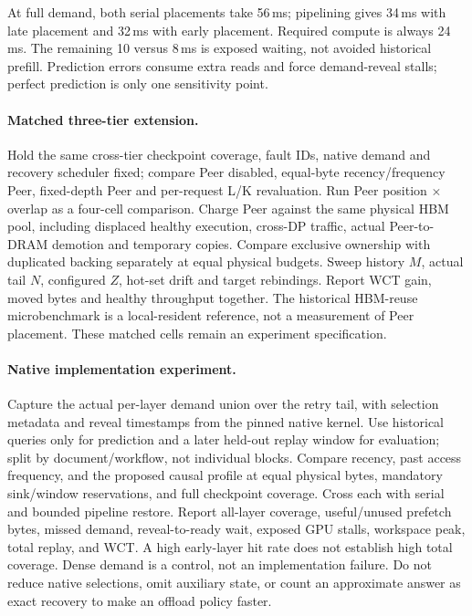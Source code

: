 \documentclass[sigplan,10pt,anonymous,nonacm]{acmart}
\begin{document}
At full demand, both serial placements take 56\,ms; pipelining gives
34\,ms with late placement and 32\,ms with early placement. Required
compute is always 24\,ms. The remaining 10 versus 8\,ms is exposed
waiting, not avoided historical prefill. Prediction errors consume
extra reads and force demand-reveal stalls; perfect prediction is only
one sensitivity point.

\paragraph{Matched three-tier extension.}
Hold the same cross-tier checkpoint coverage, fault IDs, native demand
and recovery scheduler fixed; compare Peer disabled, equal-byte
recency/frequency Peer, fixed-depth Peer and per-request L/K revaluation.
Run Peer position $\times$ overlap as a four-cell comparison. Charge
Peer against the same physical HBM pool, including displaced healthy
execution, cross-DP traffic, actual Peer-to-DRAM demotion and temporary
copies. Compare exclusive ownership with duplicated backing separately
at equal physical budgets. Sweep history $M$, actual tail $N$, configured
$Z$, hot-set drift and target rebindings. Report WCT gain, moved bytes and
healthy throughput together. The historical HBM-reuse microbenchmark is
a local-resident reference, not a measurement of Peer placement. These
matched cells remain an experiment specification.

\paragraph{Native implementation experiment.}
Capture the actual per-layer demand union over the retry tail, with
selection metadata and reveal timestamps from the pinned native kernel.
Use historical queries only for prediction and a later held-out replay
window for evaluation; split by document/workflow, not individual blocks.
Compare recency, past access frequency, and the proposed causal profile
at equal physical bytes, mandatory sink/window reservations, and full
checkpoint coverage. Cross each with serial and bounded pipeline restore.
Report all-layer coverage, useful/unused prefetch bytes, missed demand,
reveal-to-ready wait, exposed GPU stalls, workspace peak, total replay,
and WCT. A high early-layer hit rate does not establish high total
coverage. Dense demand is a control, not an implementation failure.
Do not reduce native selections, omit auxiliary state, or count an
approximate answer as exact recovery to make an offload policy faster.
\end{document}
